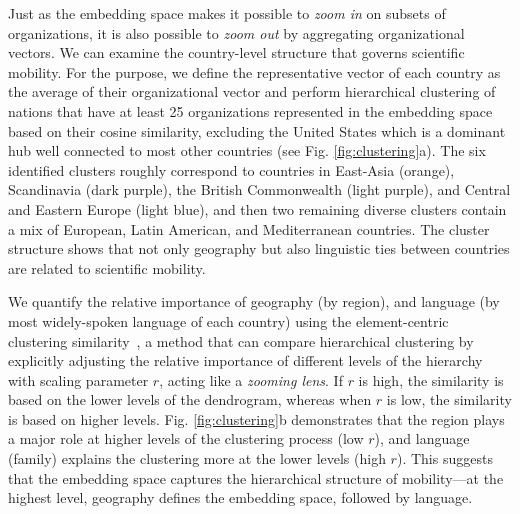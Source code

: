 \documentclass[12pt]{article} %
\begin{document}
Just as the embedding space makes it possible to \textit{zoom in} on subsets of organizations, it is also possible to \textit{zoom out}  by aggregating organizational vectors.
We can examine the country-level structure that governs scientific mobility.
For the purpose, we define the representative vector of each country as the average of their organizational vector and perform hierarchical clustering of nations that have at least 25 organizations represented in the embedding space based on their cosine similarity, excluding the United States which is a dominant hub well connected to most other countries (see Fig. \ref{fig:clustering}a).
The six identified clusters roughly correspond to countries in East-Asia (orange), Scandinavia (dark purple), the British Commonwealth (light purple), and Central and Eastern Europe (light blue), and then two remaining diverse clusters contain a mix of European, Latin American, and Mediterranean countries.
The cluster structure shows that not only geography but also linguistic ties between countries are related to scientific mobility.

We quantify the relative importance of geography (by region), and language (by most widely-spoken language of each country) using the element-centric clustering similarity~\autocite{gates2019element}, a method that can compare hierarchical clustering by explicitly adjusting the relative importance of different levels of the hierarchy with scaling parameter $r$, acting like a \textit{zooming lens}.
If $r$ is high, the similarity is based on the lower levels of the dendrogram, whereas when $r$ is low, the similarity is based on higher levels.
Fig. \ref{fig:clustering}b demonstrates that the region plays a major role at higher levels of the clustering process (low $r$), and language (family) explains the clustering more at the lower levels (high $r$).
This suggests that the embedding space captures the hierarchical structure of mobility---at the highest level, geography defines the embedding space, followed by language.
\end{document}
